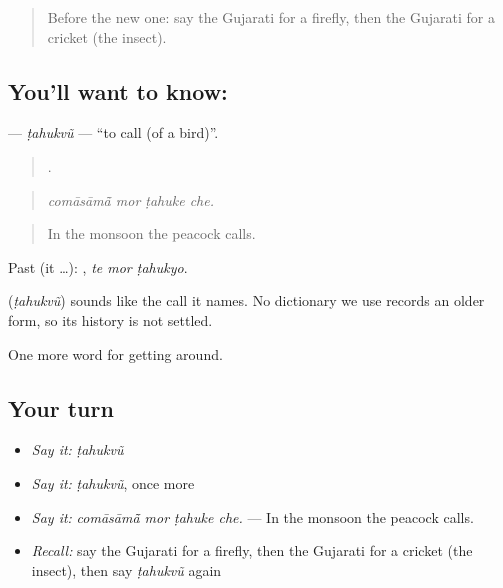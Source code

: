 \label{lesson:GU-C445-tahukvu}



\begin{quote}
Before the new one: say the Gujarati for a firefly, then the Gujarati for a cricket (the insect).
\end{quote}

\subsection*{You'll want to know: }
\textbf{} — \emph{ṭahukvũ} — \textquotedblleft{}to call (of a bird)\textquotedblright{}.

\begin{quote}
   .
\end{quote}

\begin{quote}
\emph{comāsāmā̃ mor ṭahuke che.}
\end{quote}

\begin{quote}
In the monsoon the peacock calls.
\end{quote}

Past (it …):   , \emph{te mor ṭahukyo}.

\begin{cousinweb}
\textbf{} (\emph{ṭahukvũ}) sounds like the call it names. No dictionary we use records an older form, so its history is not settled.
\end{cousinweb}

\begin{grammarlens}[title={What you've built}]
One more word for getting around.
\end{grammarlens}

\subsection*{Your turn}
\begin{itemize}
\raggedright
  \item \emph{Say it:} \emph{ṭahukvũ}
  \item \emph{Say it:} \emph{ṭahukvũ}, once more
  \item \emph{Say it:} \emph{comāsāmā̃ mor ṭahuke che.} — In the monsoon the peacock calls.
  \item \emph{Recall:} say the Gujarati for a firefly, then the Gujarati for a cricket (the insect), then say \emph{ṭahukvũ} again
\end{itemize}

